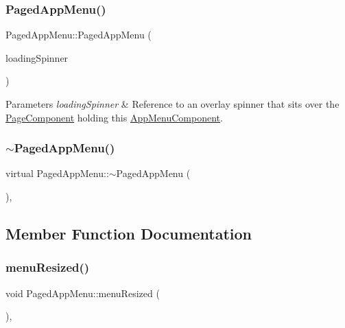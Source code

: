 \subsubsection{\texorpdfstring{Paged\+App\+Menu()}{PagedAppMenu()}}
{\footnotesize\ttfamily Paged\+App\+Menu\+::\+Paged\+App\+Menu (\begin{DoxyParamCaption}\item[{\mbox{\hyperlink{classOverlaySpinner}{Overlay\+Spinner}} \&}]{loading\+Spinner }\end{DoxyParamCaption})}


\begin{DoxyParams}{Parameters}
{\em loading\+Spinner} & Reference to an overlay spinner that sits over the \mbox{\hyperlink{classPageComponent}{Page\+Component}} holding this \mbox{\hyperlink{classAppMenuComponent}{App\+Menu\+Component}}. \\
\hline
\end{DoxyParams}
\mbox{\label{classPagedAppMenu_a99aef92443ae80e288041593a23205de}} 
\subsubsection{\texorpdfstring{$\sim$\+Paged\+App\+Menu()}{~PagedAppMenu()}}
{\footnotesize\ttfamily virtual Paged\+App\+Menu\+::$\sim$\+Paged\+App\+Menu (\begin{DoxyParamCaption}{ }\end{DoxyParamCaption})\hspace{0.3cm}{\ttfamily [inline]}, {\ttfamily [virtual]}}



\subsection{Member Function Documentation}
\mbox{\label{classPagedAppMenu_a1f79e778c41331eda6ed158448dc14e7}} 
\subsubsection{\texorpdfstring{menu\+Resized()}{menuResized()}}
{\footnotesize\ttfamily void Paged\+App\+Menu\+::menu\+Resized (\begin{DoxyParamCaption}{ }\end{DoxyParamCaption})\hspace{0.3cm}{\ttfamily [override]}, {\ttfamily [virtual]}}

